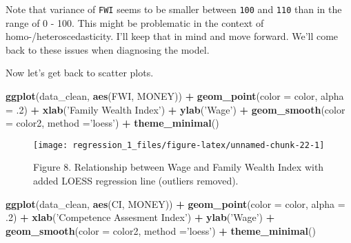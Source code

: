 \documentclass[]{article}
\newenvironment{Shaded}{\begin{snugshade}}{\end{snugshade}}
\newcommand{\DataTypeTok}[1]{\textcolor[rgb]{0.13,0.29,0.53}{#1}}
\newcommand{\FloatTok}[1]{\textcolor[rgb]{0.00,0.00,0.81}{#1}}
\newcommand{\KeywordTok}[1]{\textcolor[rgb]{0.13,0.29,0.53}{\textbf{#1}}}
\newcommand{\NormalTok}[1]{#1}
\newcommand{\OperatorTok}[1]{\textcolor[rgb]{0.81,0.36,0.00}{\textbf{#1}}}
\newcommand{\StringTok}[1]{\textcolor[rgb]{0.31,0.60,0.02}{#1}}
\begin{document}
Note that variance of \texttt{FWI} seems to be smaller between
\texttt{100} and \texttt{110} than in the range of 0 - 100. This might
be problematic in the context of homo-/heteroscedasticity. I'll keep
that in mind and move forward. We'll come back to these issues when
diagnosing the model.

Now let's get back to scatter plots.

\begin{Shaded}
\begin{Highlighting}[]
\KeywordTok{ggplot}\NormalTok{(data_clean, }\KeywordTok{aes}\NormalTok{(FWI, MONEY)) }\OperatorTok{+}\StringTok{ }\KeywordTok{geom_point}\NormalTok{(}\DataTypeTok{color =}\NormalTok{ color, }
                                          \DataTypeTok{alpha =} \FloatTok{.2}\NormalTok{) }\OperatorTok{+}\StringTok{ }
\StringTok{                               }\KeywordTok{xlab}\NormalTok{(}\StringTok{'Family Wealth Index'}\NormalTok{) }\OperatorTok{+}\StringTok{ }
\StringTok{                               }\KeywordTok{ylab}\NormalTok{(}\StringTok{'Wage'}\NormalTok{) }\OperatorTok{+}\StringTok{ }
\StringTok{                               }\KeywordTok{geom_smooth}\NormalTok{(}\DataTypeTok{color  =}\NormalTok{ color2, }
                                           \DataTypeTok{method =}\StringTok{'loess'}\NormalTok{) }\OperatorTok{+}\StringTok{ }
\StringTok{                               }\KeywordTok{theme_minimal}\NormalTok{()}
\end{Highlighting}
\end{Shaded}

\begin{figure}

{\centering \texttt{[image: regression\_1\_files/figure-latex/unnamed-chunk-22-1]} 

}

\caption{Figure 8. Relationship between Wage and Family Wealth Index with added LOESS regression line (outliers removed).}\label{fig:unnamed-chunk-22}
\end{figure}

\begin{Shaded}
\begin{Highlighting}[]
\KeywordTok{ggplot}\NormalTok{(data_clean, }\KeywordTok{aes}\NormalTok{(CI, MONEY)) }\OperatorTok{+}\StringTok{ }\KeywordTok{geom_point}\NormalTok{(}\DataTypeTok{color =}\NormalTok{ color, }
                                          \DataTypeTok{alpha =} \FloatTok{.2}\NormalTok{) }\OperatorTok{+}\StringTok{ }
\StringTok{                               }\KeywordTok{xlab}\NormalTok{(}\StringTok{'Competence Assesment Index'}\NormalTok{) }\OperatorTok{+}\StringTok{ }
\StringTok{                               }\KeywordTok{ylab}\NormalTok{(}\StringTok{'Wage'}\NormalTok{) }\OperatorTok{+}\StringTok{ }
\StringTok{                               }\KeywordTok{geom_smooth}\NormalTok{(}\DataTypeTok{color  =}\NormalTok{ color2, }
                                           \DataTypeTok{method =}\StringTok{'loess'}\NormalTok{) }\OperatorTok{+}\StringTok{ }
\StringTok{                               }\KeywordTok{theme_minimal}\NormalTok{()}
\end{Highlighting}
\end{Shaded}
\end{document}

